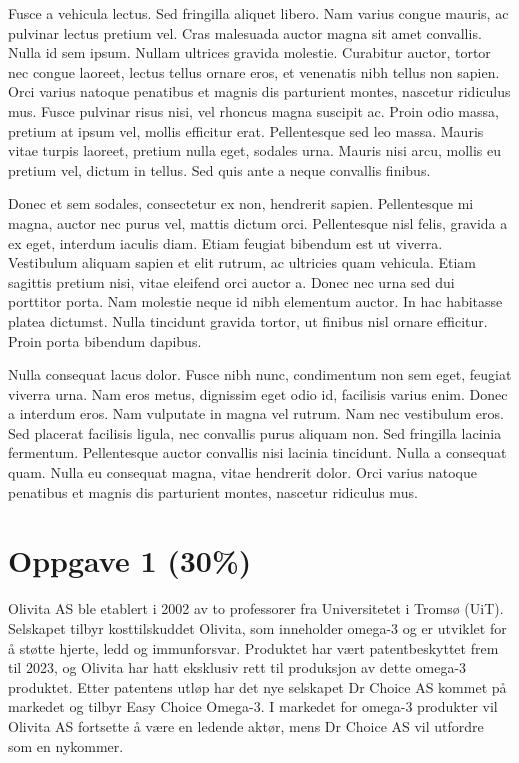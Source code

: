 \documentclass[
  12pt,
  a4paper,
  DIV=11,
  numbers=noendperiod]{scrartcl}
\renewcommand*\contentsname{Table of contents}
\newcommand\contentsname{Table of contents}
\begin{document}
Fusce a vehicula lectus. Sed fringilla aliquet libero. Nam varius congue mauris, ac pulvinar lectus pretium vel. Cras malesuada auctor magna sit amet convallis. Nulla id sem ipsum. Nullam ultrices gravida molestie. Curabitur auctor, tortor nec congue laoreet, lectus tellus ornare eros, et venenatis nibh tellus non sapien. Orci varius natoque penatibus et magnis dis parturient montes, nascetur ridiculus mus. Fusce pulvinar risus nisi, vel rhoncus magna suscipit ac. Proin odio massa, pretium at ipsum vel, mollis efficitur erat. Pellentesque sed leo massa. Mauris vitae turpis laoreet, pretium nulla eget, sodales urna. Mauris nisi arcu, mollis eu pretium vel, dictum in tellus. Sed quis ante a neque convallis finibus.

Donec et sem sodales, consectetur ex non, hendrerit sapien. Pellentesque mi magna, auctor nec purus vel, mattis dictum orci. Pellentesque nisl felis, gravida a ex eget, interdum iaculis diam. Etiam feugiat bibendum est ut viverra. Vestibulum aliquam sapien et elit rutrum, ac ultricies quam vehicula. Etiam sagittis pretium nisi, vitae eleifend orci auctor a. Donec nec urna sed dui porttitor porta. Nam molestie neque id nibh elementum auctor. In hac habitasse platea dictumst. Nulla tincidunt gravida tortor, ut finibus nisl ornare efficitur. Proin porta bibendum dapibus.

Nulla consequat lacus dolor. Fusce nibh nunc, condimentum non sem eget, feugiat viverra urna. Nam eros metus, dignissim eget odio id, facilisis varius enim. Donec a interdum eros. Nam vulputate in magna vel rutrum. Nam nec vestibulum eros. Sed placerat facilisis ligula, nec convallis purus aliquam non. Sed fringilla lacinia fermentum. Pellentesque auctor convallis nisi lacinia tincidunt. Nulla a consequat quam. Nulla eu consequat magna, vitae hendrerit dolor. Orci varius natoque penatibus et magnis dis parturient montes, nascetur ridiculus mus.

\newpage
\hypersetup{linkcolor=black}
\renewcommand{\contentsname}{Innholdsfortegnelse}
\renewcommand*{\figureautorefname}{Figur}
\renewcommand*{\tableautorefname}{Tabell}
\tableofcontents
\newpage
\listoffigures
\listoftables
\hypersetup{linkcolor=blue}
\newpage

\section{Oppgave 1 (30\%)}\label{oppgave-1-30}

Olivita AS ble etablert i 2002 av to professorer fra Universitetet i
Tromsø (UiT). Selskapet tilbyr kosttilskuddet Olivita, som inneholder
omega-3 og er utviklet for å støtte hjerte, ledd og immunforsvar.
Produktet har vært patentbeskyttet frem til 2023, og Olivita har hatt
eksklusiv rett til produksjon av dette omega-3 produktet. Etter
patentens utløp har det nye selskapet Dr Choice AS kommet på markedet og
tilbyr Easy Choice Omega-3. I markedet for omega-3 produkter vil Olivita
AS fortsette å være en ledende aktør, mens Dr Choice AS vil utfordre som
en nykommer.
\end{document}
